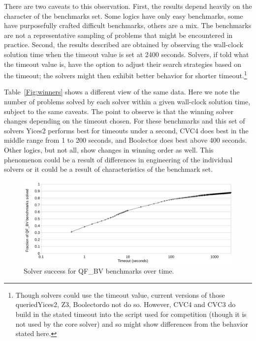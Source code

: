 \documentclass[twoside,11pt]{article}
\begin{document}
There are two caveats to this observation. First, the results depend heavily on the character of the benchmarks set. Some logics have only easy benchmarks, some have purposefully crafted difficult benchmarks, others are a mix. The benchmarks are not a representative sampling of problems that might be encountered in practice.  Second, the results described are obtained by observing the wall-clock solution time when the timeout value is set at 2400 seconds. Solvers, if told what the timeout value is, have the option to adjust their search strategies based on the timeout; the solvers might then exhibit better behavior for shorter timeout.\footnote{Though solvers could use the timeout value, current versions of those queried\textemdash Yices2, Z3, Boolector\textemdash do not do so. However, CVC4 and CVC3 do build in the stated timeout into the script used for competition (though it is not used by the core solver) and so might show differences from the behavior stated here.}

Table~\ref{Fig:winners} shows a different view of the same data. Here we note the number of problems solved by each solver within a given wall-clock solution time, subject to the same caveats. The point to observe is that the winning solver changes depending on the timeout chosen. For these benchmarks and this set of solvers Yices2 performs best for timeouts under a second, CVC4 does best in the middle range from 1 to 200 seconds, and Boolector does best above 400 seconds. Other logics, but not all, show changes in winning order as well. This phenomenon could be a result of differences in engineering of the individual solvers or it could be a result of characteristics of the benchmark set.

\begin{figure}
\begin{center}
\includegraphics[width=.95\textwidth]{QF_BV-timeout-logscale.pdf}
\end{center}
\caption{Solver success for QF\_BV benchmarks over time.}
\label{Fig:timeouts}
\end{figure} 
\end{document}
